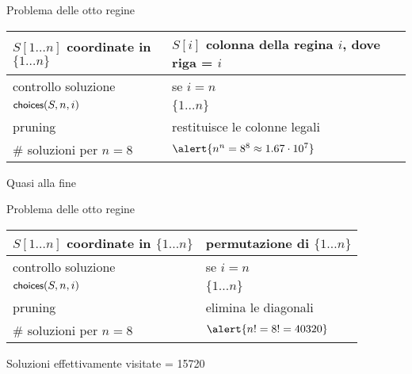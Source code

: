 \begin{frame}{Problema delle otto regine}


\medskip
\begin{tabular}{|P{4cm}|P{7.1cm}|}
\hline
$S[1 \ldots n]$ coordinate in $\{ 1 \ldots n \}$	&	$S[i]$ colonna della regina $i$, dove riga = $i$ \\\hline
controllo soluzione	& se $i = n$ \\\hline
$\textsf{{\small choices}}(S, n, i)$	&	$\{ 1 \ldots n \}$ \\\hline
pruning	&	restituisce le colonne legali \\\hline
\# soluzioni per $n=8$ 	&		$\alert{n^n = 8^{8} \approx 1.67 \cdot 10^{7}}$\\\hline 
\end{tabular}

\smallskip
{}
\BI
\item Quasi alla fine
\EI

\end{frame}

\begin{frame}{Problema delle otto regine}


\medskip
\begin{tabular}{|P{4cm}|P{7.1cm}|}
\hline
$S[1 \ldots n]$ coordinate in $\{ 1 \ldots n \}$	&	permutazione di $\{ 1 \ldots n \}$ \\\hline
controllo soluzione	& se $i = n$ \\\hline
$\textsf{{\small choices}}(S, n, i)$	&	$\{ 1 \ldots n \}$ \\\hline
pruning	&	elimina le diagonali \\\hline
\# soluzioni per $n=8$ 	&		$\alert{n! = 8! = 40320}$\\\hline 
\end{tabular}

\smallskip
{}
\BI
\item Soluzioni effettivamente visitate = 15720
\EI

\end{frame}

